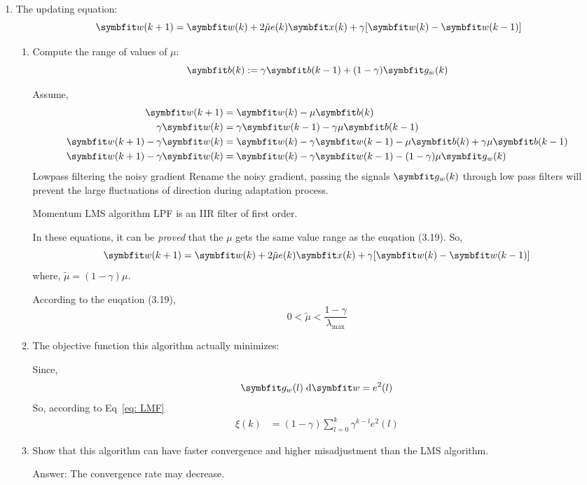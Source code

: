 \documentclass[11pt]{article}
\begin{document}
\begin{enumerate}[itemindent= 0pt]
    \item  The updating equation:
        $$\Vector{w}(k+1) = \Vector{w}(k) +2 \tilde{\mu} e(k)\Vector{x}(k) +\gamma [\Vector{w}(k)-\Vector{w}(k-1)] $$
        \begin{enumerate}[itemindent= -5pt]
            \item Compute the range of values of $\mu$:
            \begin{equation}\label{eq: LMF}
                \Vector{b}(k) :=  \gamma \Vector{b}(k-1) + (1-\gamma)\Vector{g}_w(k)
            \end{equation}

            Assume,
            $$
            \begin{aligned}
            \Vector{w}(k+1) &=\Vector{w}(k)-\mu \Vector{b}(k) \\
            \gamma \Vector{w}(k) &=\gamma \Vector{w}(k-1)-\gamma \mu \Vector{b}(k-1) \\
            \Vector{w}(k+1)-\gamma \Vector{w}(k) &=\Vector{w}(k)-\gamma \Vector{w}(k-1)-\mu \Vector{b}(k)+\gamma \mu \Vector{b}(k-1)\\
            \Vector{w}(k+1)-\gamma \Vector{w}(k) &=\Vector{w}(k)-\gamma \Vector{w}(k-1)- (1-\gamma) \mu \Vector{g}_w(k)
            \end{aligned}
            $$
            Lowpass filtering the noisy gradient Rename the noisy gradient, passing the signals $ \Vector{g}_w(k) $ through low pass filters will prevent the large fluctuations of direction during adaptation process.

            Momentum LMS algorithm LPF is an IIR filter of first order.

            In these equations, it can be \emph{proved} that the $\mu$ gets the same value range as the euqation (3.19).
            So,
            $$
            \Vector{w}(k+1) = \Vector{w}(k) +2 \tilde{\mu} e(k)\Vector{x}(k) +\gamma [\Vector{w}(k)-\Vector{w}(k-1)]
            $$
            where,
            $
            \tilde{\mu} = (1-\gamma) \mu.
            $

            According to the euqation (3.19),
            $$
            0<\tilde{\mu}<\frac{1-\gamma}{\lambda_{\max }}
            $$
            \item The objective function this algorithm actually minimizes:

            Since,
            $$
            \Vector{g}_w(l)\;\mathrm{d} \Vector{w} = e^2(l)
            $$
            So, according to Eq~\eqref{eq: LMF}
            \begin{align*}
                \xi(k) &=  (1 - \gamma) \sum_{l=0}^{k}\gamma^{k-l}e^2(l)
            \end{align*}

            \item Show that this algorithm can have faster convergence and higher misadjustment than the LMS algorithm.

            Answer: The convergence rate may decrease.
        \end{enumerate}
\end{enumerate}
\end{document}
